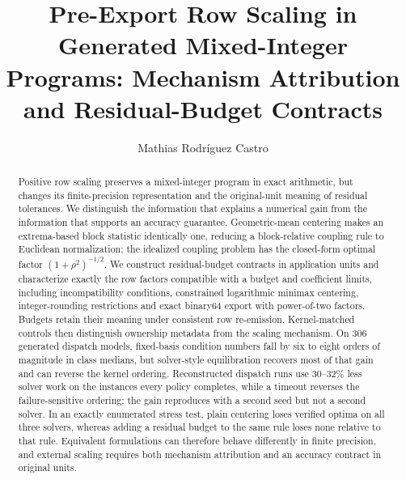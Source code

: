 \documentclass[smallextended,envcountsect,envcountsame]{svjour3}
\begin{document}
\title{Pre-Export Row Scaling in Generated Mixed-Integer Programs: Mechanism Attribution and
Residual-Budget Contracts}
\author{Mathias Rodr\'iguez Castro}
\date{}
\maketitle

\begin{abstract}
Positive row scaling preserves a mixed-integer program in exact arithmetic, but changes its
finite-precision representation and the original-unit meaning of residual tolerances.
We distinguish the information that explains a numerical gain from the information that
supports an accuracy guarantee. Geometric-mean centering makes an extrema-based block
statistic identically one, reducing a block-relative coupling rule to Euclidean normalization;
the idealized coupling problem has the closed-form optimal factor $(1+\rho^2)^{-1/2}$.
We construct residual-budget contracts in application units and characterize exactly the row
factors compatible with a budget and coefficient limits, including incompatibility conditions,
constrained logarithmic minimax centering, integer-rounding restrictions and exact binary64
export with power-of-two factors. Budgets retain their meaning under consistent row re-emission.
Kernel-matched controls then distinguish ownership metadata
from the scaling mechanism. On 306 generated dispatch models, fixed-basis condition numbers
fall by six to eight orders of magnitude in class medians, but solver-style equilibration
recovers most of that gain and can reverse the kernel ordering. Reconstructed dispatch runs
use 30--32\% less solver work on the instances every policy completes, while a timeout reverses
the failure-sensitive ordering; the gain reproduces with a second seed but not a second solver.
In an exactly enumerated stress test, plain centering loses verified optima on all three solvers,
whereas adding a residual budget to the same rule loses none relative to that rule.
Equivalent formulations can therefore behave differently in finite precision, and external
scaling requires both mechanism attribution and an accuracy contract in original units.
\end{abstract}
\end{document}
